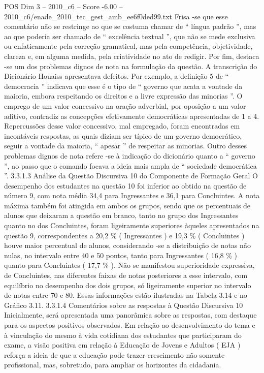 \begin{textsample}{POS Dim 3 – 2010\_c6 – Score -6.00 – 2010\_c6/enade\_2010\_tec\_gest\_amb\_ee6f0ded99.txt}
Frisa -se que esse comentário não se restringe ao que se costuma chamar de “ língua padrão ”, mas ao que poderia ser chamado de “ excelência textual ”, que não se mede exclusiva ou enfaticamente pela correção gramatical, mas pela competência, objetividade, clareza e, em alguma medida, pela criatividade no ato de redigir.
Por fim, destaca -se um dos problemas dignos de nota na formulação da questão.
A transcrição do Dicionário Houaiss apresentava defeitos.
Por exemplo, a definição 5 de “ democracia ” indicava que esse é o tipo de “ governo que acata a vontade da maioria, embora respeitando os direitos e a livre expressão das minorias ”.
O emprego de um valor concessivo na oração adverbial, por oposição a um valor aditivo, contradiz as concepções efetivamente democráticas apresentadas de 1 a 4.
Repercussões desse valor concessivo, mal empregado, foram encontradas em incontáveis respostas, as quais diziam ser típico de um governo democrático, seguir a vontade da maioria, “ apesar ” de respeitar as minorias.
Outro desses problemas dignos de nota refere -se à indicação do dicionário quanto a “ governo ”, ao passo que o comando focava a ideia mais ampla de “ sociedade democrática ”. 3.3.1.3 Análise da Questão Discursiva 10 do Componente de Formação Geral O desempenho dos estudantes na questão 10 foi inferior ao obtido na questão de número 9, com nota média 34,4 para Ingressantes e 36,1 para Concluintes.
A nota máxima também foi atingida em ambos os grupos, sendo que os percentuais de alunos que deixaram a questão em branco, tanto no grupo dos Ingressantes quanto no dos Concluintes, foram ligeiramente superiores àqueles apresentados na questão 9, correspondentes a 20,2 \% ( Ingressantes ) e 19,3 \% ( Concluintes ) houve maior percentual de alunos, considerando -se a distribuição de notas não nulas, no intervalo entre 40 e 50 pontos, tanto para Ingressantes ( 16,8 \% ) quanto para Concluintes ( 17,7 \% ).
Não se manifestou superioridade expressiva, de Concluintes, nas diferentes faixas de notas posteriores a esse intervalo, com equilíbrio no desempenho dos dois grupos, só ligeiramente superior no intervalo de notas entre 70 e 80.
Essas informações estão ilustradas na Tabela 3.14 e no Gráfico 3.11. 3.3.1.4 Comentários sobre as respostas à Questão Discursiva 10 Inicialmente, será apresentada uma panorâmica sobre as respostas, com destaque para os aspectos positivos observados.
Em relação ao desenvolvimento do tema e à vinculação do mesmo à vida cotidiana dos estudantes que participaram do exame, a visão positiva em relação à Educação de Jovens e Adultos ( EJA ) reforça a ideia de que a educação pode trazer crescimento não somente profissional, mas, sobretudo, para ampliar os horizontes da cidadania.

\end{textsample}
